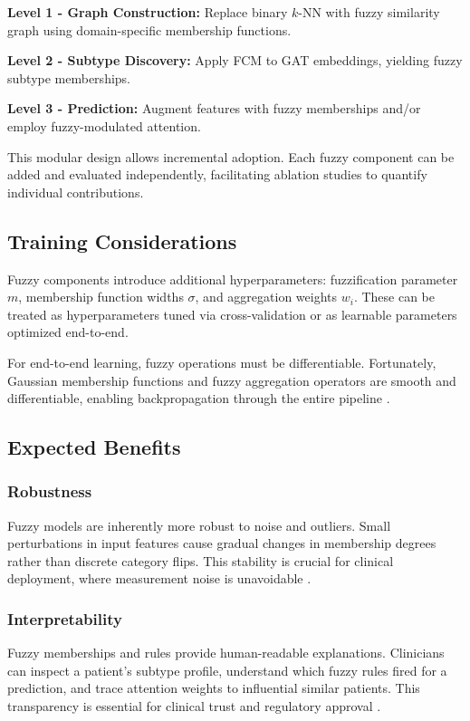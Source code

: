 \documentclass[conference]{IEEEtran}
\begin{document}
\textbf{Level 1 - Graph Construction:} Replace binary $k$-NN with fuzzy similarity graph using domain-specific membership functions.

\textbf{Level 2 - Subtype Discovery:} Apply FCM to GAT embeddings, yielding fuzzy subtype memberships.

\textbf{Level 3 - Prediction:} Augment features with fuzzy memberships and/or employ fuzzy-modulated attention.

This modular design allows incremental adoption. Each fuzzy component can be added and evaluated independently, facilitating ablation studies to quantify individual contributions.

\subsection{Training Considerations}

Fuzzy components introduce additional hyperparameters: fuzzification parameter $m$, membership function widths $\sigma$, and aggregation weights $w_i$. These can be treated as hyperparameters tuned via cross-validation or as learnable parameters optimized end-to-end.

For end-to-end learning, fuzzy operations must be differentiable. Fortunately, Gaussian membership functions and fuzzy aggregation operators are smooth and differentiable, enabling backpropagation through the entire pipeline \cite{guney2020fuzzy}.

\subsection{Expected Benefits}

\subsubsection{Robustness}
Fuzzy models are inherently more robust to noise and outliers. Small perturbations in input features cause gradual changes in membership degrees rather than discrete category flips. This stability is crucial for clinical deployment, where measurement noise is unavoidable \cite{kuncheva2010fuzzy}.

\subsubsection{Interpretability}
Fuzzy memberships and rules provide human-readable explanations. Clinicians can inspect a patient's subtype profile, understand which fuzzy rules fired for a prediction, and trace attention weights to influential similar patients. This transparency is essential for clinical trust and regulatory approval \cite{holzinger2019causability}.
\end{document}
